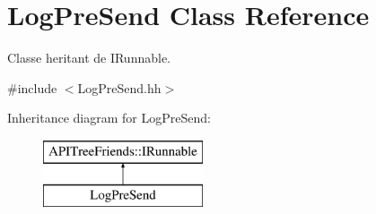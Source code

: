 \hypertarget{class_log_pre_send}{}\section{Log\+Pre\+Send Class Reference}
\label{class_log_pre_send}


Classe heritant de I\+Runnable.  




{\ttfamily \#include $<$Log\+Pre\+Send.\+hh$>$}

Inheritance diagram for Log\+Pre\+Send\+:\begin{figure}[H]
\begin{center}
\leavevmode
\includegraphics[height=2.000000cm]{class_log_pre_send}
\end{center}
\end{figure}
